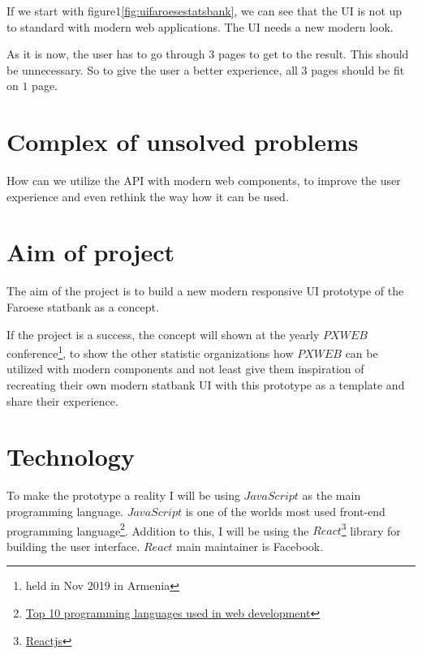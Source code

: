 If we start with figure1\ref{fig:uifaroesestatsbank}, we can see that the UI is not up to standard with modern web applications. The UI needs a new modern look.

As it is now, the user has to go through $3$ pages to get to the result. This should be unnecessary. So to give the user a better experience, all $3$ pages should be fit on $1$ page.

\noindent{}




  
\section{Complex of unsolved problems}
How can we utilize the API with modern web components, to improve the user experience and even rethink the way how it can be used.

\section{Aim of project}
The aim of the project is to build a new modern responsive UI prototype of the Faroese statbank as a concept.

If the project is a success, the concept will shown at the yearly $PXWEB$ conference\footnote{held in Nov 2019 in Armenia}, to show the other statistic organizations how $PXWEB$ can be utilized with modern components and not least give them inspiration of recreating their own modern statbank UI with this prototype as a template and share their experience. 

\section{Technology}
To make the prototype a reality I will be using $JavaScript$ as the main programming language. $JavaScript$ is one of the worlds most used front-end programming language\footnote{\href{http://blog.stoneriverelearning.com/top-10-programming-languages-used-in-web-development/}{Top 10 programming languages used in web development}\label{jstop10}}. Addition to this, I will be using the $React$\footnote{\href{https://reactjs.org/}{Reactjs}\label{react}} library for building the user interface. $React$ main maintainer is Facebook.

